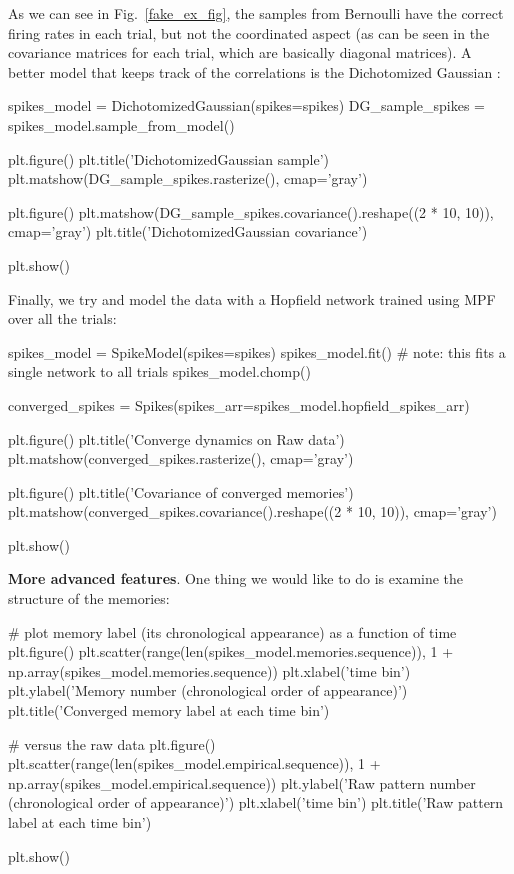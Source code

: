 \documentclass[letter, 12pt]{article}
\theoremstyle{definition}
\theoremstyle{remark}
\begin{document}
As we can see in Fig.~\ref{fake_ex_fig}, the samples from Bernoulli have the correct firing rates in each trial, but not the coordinated aspect (as can be seen in the covariance matrices for each trial, which are basically diagonal matrices).   A better model that keeps track of the correlations is the Dichotomized Gaussian \cite{bethge2008}: \\

\begin{python}
spikes_model = DichotomizedGaussian(spikes=spikes)
DG_sample_spikes = spikes_model.sample_from_model()

plt.figure()
plt.title('DichotomizedGaussian sample')
plt.matshow(DG_sample_spikes.rasterize(), cmap='gray')

plt.figure()
plt.matshow(DG_sample_spikes.covariance().reshape((2 * 10, 10)), cmap='gray')
plt.title('DichotomizedGaussian covariance')

plt.show()
\end{python}

Finally, we try and model the data with a Hopfield network trained using MPF \cite{HS-DK201} over all the trials:

\begin{python}
spikes_model = SpikeModel(spikes=spikes)
spikes_model.fit()  # note: this fits a single network to all trials
spikes_model.chomp()

converged_spikes = Spikes(spikes_arr=spikes_model.hopfield_spikes_arr)

plt.figure()
plt.title('Converge dynamics on Raw data')
plt.matshow(converged_spikes.rasterize(), cmap='gray')

plt.figure()
plt.title('Covariance of converged memories')
plt.matshow(converged_spikes.covariance().reshape((2 * 10, 10)), cmap='gray')

plt.show()
\end{python}

\textbf{More advanced features}.  One thing we would like to do is examine the structure of the memories:

\begin{python}
# plot memory label (its chronological appearance) as a function of time
plt.figure()
plt.scatter(range(len(spikes_model.memories.sequence)),
		1 + np.array(spikes_model.memories.sequence))
plt.xlabel('time bin')
plt.ylabel('Memory number (chronological order of appearance)')
plt.title('Converged memory label at each time bin')

# versus the raw data
plt.figure()
plt.scatter(range(len(spikes_model.empirical.sequence)),
		1 + np.array(spikes_model.empirical.sequence))
plt.ylabel('Raw pattern number (chronological order of appearance)')
plt.xlabel('time bin')
plt.title('Raw pattern label at each time bin')

plt.show()
\end{python}
 
\end{document}
